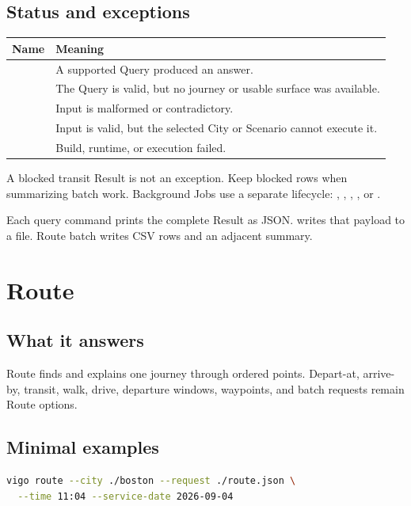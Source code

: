 \documentclass[10pt,letterpaper]{article}
\begin{document}
\subsection{Status and exceptions}

\begin{center}
\begin{tabularx}{\linewidth}{P{1.35in} Y}
\toprule
\textbf{Name} & \textbf{Meaning} \\
\midrule
{} & A supported Query produced an answer. \\
 & The Query is valid, but no journey or usable surface was available. \\
 & Input is malformed or contradictory. \\
 & Input is valid, but the selected City or Scenario cannot execute it. \\
 & Build, runtime, or execution failed. \\
\bottomrule
\end{tabularx}
\end{center}

A blocked transit Result is not an exception. Keep blocked rows when summarizing batch work. Background Jobs use a separate lifecycle: , , , , or .

Each query command prints the complete Result as JSON.  writes that payload to a file. Route batch writes CSV rows and an adjacent summary.

\section{Route}

\subsection{What it answers}

Route finds and explains one journey through ordered points. Depart-at, arrive-by, transit, walk, drive, departure windows, waypoints, and batch requests remain Route options.

\subsection{Minimal examples}

\begin{lstlisting}[language=bash]
vigo route --city ./boston --request ./route.json \
  --time 11:04 --service-date 2026-09-04
\end{lstlisting}
\end{document}
